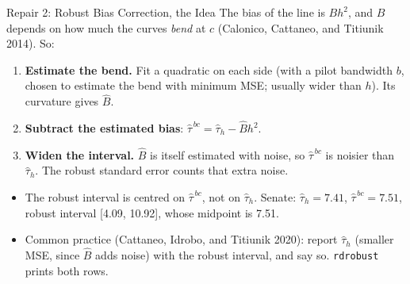 \documentclass[aspectratio=169,11pt,xcolor=dvipsnames]{beamer}
\newcommand{\srcp}[1]{{\scriptsize\color{gray}(#1)}}
\begin{document}
\begin{frame}{Repair 2: Robust Bias Correction, the Idea}
The bias of the line is $B h^2$, and $B$ depends on how much the curves
\emph{bend} at $c$ \srcp{Calonico, Cattaneo, and Titiunik 2014}. So:
\vskip3pt
\begin{enumerate}\itemsep4pt
  \item \textbf{Estimate the bend.} Fit a quadratic on each side (with a pilot
        bandwidth $b$, chosen to estimate the bend with minimum MSE; usually wider
        than $h$). Its curvature gives $\hat B$.
  \item \textbf{Subtract the estimated bias}: $\hat\tau^{\,bc} = \hat\tau_h - \hat B h^2$.
  \item \textbf{Widen the interval.} $\hat B$ is itself estimated with noise, so
        $\hat\tau^{\,bc}$ is noisier than $\hat\tau_h$. The \alert{robust}
        standard error counts that extra noise.
\end{enumerate}
\vskip4pt
\begin{itemize}\itemsep2pt
  \item The robust interval is centred on $\hat\tau^{\,bc}$, not on $\hat\tau_h$.
        Senate: $\hat\tau_h = 7.41$, $\hat\tau^{\,bc} = 7.51$, robust interval
        [4.09, 10.92], whose midpoint is 7.51.
  \item Common practice \srcp{Cattaneo, Idrobo, and Titiunik 2020}: report $\hat\tau_h$
        (smaller MSE, since $\hat B$ adds noise) with the robust interval, and say so.
        \texttt{rdrobust} prints both rows.
\end{itemize}
\end{frame}
\end{document}
